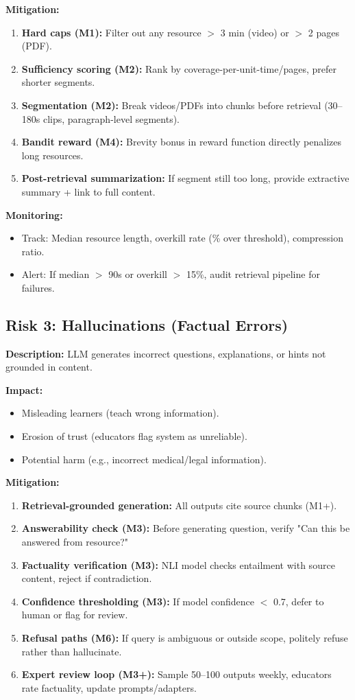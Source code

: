 \documentclass[11pt,letterpaper]{article}
\begin{document}
\textbf{Mitigation:}
\begin{enumerate}
\item \textbf{Hard caps (M1):} Filter out any resource $>$ 3 min (video) or $>$ 2 pages (PDF).
\item \textbf{Sufficiency scoring (M2):} Rank by coverage-per-unit-time/pages, prefer shorter segments.
\item \textbf{Segmentation (M2):} Break videos/PDFs into chunks before retrieval (30--180s clips, paragraph-level segments).
\item \textbf{Bandit reward (M4):} Brevity bonus in reward function directly penalizes long resources.
\item \textbf{Post-retrieval summarization:} If segment still too long, provide extractive summary + link to full content.
\end{enumerate}

\textbf{Monitoring:}
\begin{itemize}
\item Track: Median resource length, overkill rate (\% over threshold), compression ratio.
\item Alert: If median $>$ 90s or overkill $>$ 15\%, audit retrieval pipeline for failures.
\end{itemize}

\subsection{Risk 3: Hallucinations (Factual Errors)}\label{subsec:risk-3-hallucinations}

\textbf{Description:} LLM generates incorrect questions, explanations, or hints not grounded in content.

\textbf{Impact:}
\begin{itemize}
\item Misleading learners (teach wrong information).
\item Erosion of trust (educators flag system as unreliable).
\item Potential harm (e.g., incorrect medical/legal information).
\end{itemize}

\textbf{Mitigation:}
\begin{enumerate}
\item \textbf{Retrieval-grounded generation:} All outputs cite source chunks (M1+).
\item \textbf{Answerability check (M3):} Before generating question, verify "Can this be answered from resource?"
\item \textbf{Factuality verification (M3):} NLI model checks entailment with source content, reject if contradiction.
\item \textbf{Confidence thresholding (M3):} If model confidence $<$ 0.7, defer to human or flag for review.
\item \textbf{Refusal paths (M6):} If query is ambiguous or outside scope, politely refuse rather than hallucinate.
\item \textbf{Expert review loop (M3+):} Sample 50--100 outputs weekly, educators rate factuality, update prompts/adapters.
\end{enumerate}
\end{document}
